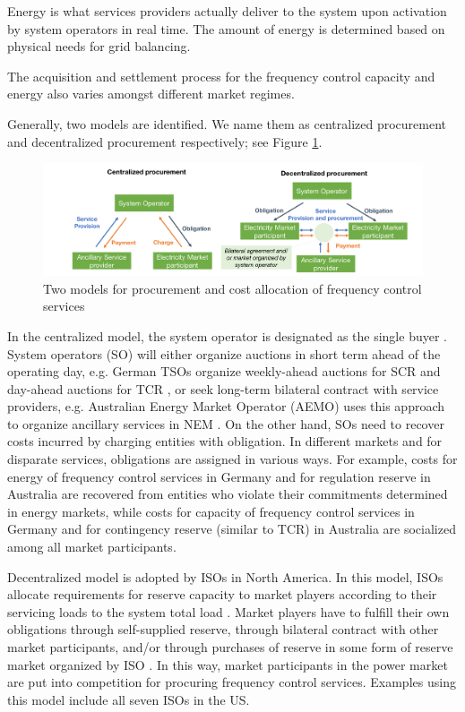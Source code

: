 Energy is what services providers actually deliver to the system upon activation by system operators in real time. The amount of energy is determined based on physical needs for grid balancing.

The acquisition and settlement process for the frequency control capacity and energy also varies amongst different market regimes.

Generally, two models are identified. We name them as centralized procurement and decentralized procurement respectively; see Figure \ref{fig:FCR_market-model}.

\begin{figure}[h!]
	\centering
	\includegraphics[width=1.05\linewidth]{Figures/FCR_market_model}
	\caption{Two models for procurement and cost allocation of frequency control services}
	\label{fig:FCR_market-model}
\end{figure}

In the centralized model, the system operator is designated as the single buyer \cite{Rebours2009}. System operators (SO) will either organize auctions in short term ahead of the operating day, e.g. German TSOs organize weekly-ahead auctions for SCR and day-ahead auctions for TCR \cite{ConsentecGmbH2014}, or seek long-term bilateral contract with service providers, e.g. Australian Energy Market Operator (AEMO) uses this approach to organize ancillary services in NEM \cite{AEMO2015}. On the other hand, SOs need to recover costs incurred by charging entities with obligation. In different markets and for disparate services, obligations are assigned in various ways. For example, costs for energy of frequency control services in Germany and for regulation reserve in Australia are recovered from entities who violate their commitments determined in energy markets, while costs for capacity of frequency control services in Germany and for contingency reserve (similar to TCR) in Australia are socialized among all market participants. 

Decentralized model is adopted by ISOs in North America. In this model, ISOs allocate requirements for reserve capacity to market players according to their servicing loads to the system total load \cite{Rebours2009,EllisonJ.F.TesfatsionL.S.LooseV.W.Byrne2012,PJM2017b}. Market players have to fulfill their own obligations through self-supplied reserve, through bilateral contract with other market participants, and/or through purchases of reserve in some form of reserve market organized by ISO \cite{EllisonJ.F.TesfatsionL.S.LooseV.W.Byrne2012}. In this way, market participants in the power market are put into competition for procuring frequency control services. Examples using this model include all seven ISOs in the US.

